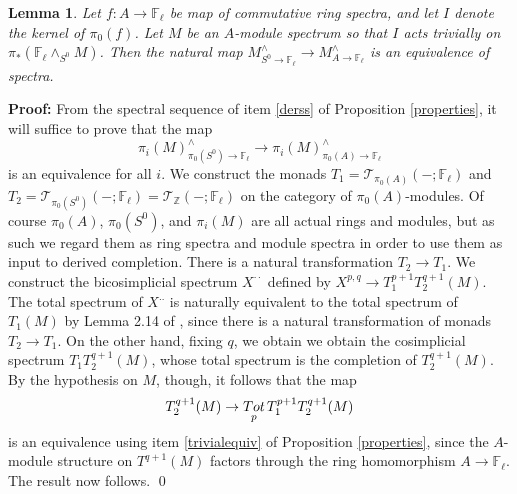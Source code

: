 \documentclass[11pt]{article}
\newcommand\mb{\mathbb}
\newcommand\mc{\mathcal}
\newtheorem{Lemma}{Lemma}[section]
\newenvironment{Proof}{\par\noindent\textbf{Proof:}}
{\qed}
\begin{document}
 \begin{Lemma}\label{sphereequiv} Let $f: A \rightarrow \mb{F}_{\ell} $ be map of commutative ring spectra, and let $I$ denote the kernel of $\pi _0(f)$.  Let $M$ be an $A$-module spectrum so that $I$ acts trivially on $\pi _*(\mb{F}_{\ell} \wedge _{S^0} M)$.  Then the natural map $M^{\wedge}_{S^0 \rightarrow \mb{F}_{\ell}}  \rightarrow M^{\wedge}_{A \rightarrow \mb{F}_{\ell}} $ is an equivalence of spectra.  
 \end{Lemma} 
 \begin{Proof}
     From the spectral sequence of item \ref{derss} of Proposition \ref{properties}, it will suffice to prove that the map 
 $$ \pi_i (M)^{\wedge}_{\pi _0(S^0) \rightarrow \mb{F}_{\ell} } \rightarrow \pi _i(M)^{\wedge} _{\pi _0(A) \rightarrow \mb{F}_{\ell} }$$ is an equivalence for all $i$. We construct the monads $T_1= \mc{T}_{\pi _0(A)}(-; \mb{F}_{\ell}) $ and $T_2= \mc{T}_{\pi _0(S^0) }(-; \mb{F}_{\ell}) = \mc{T}_{\mb{Z}}(-;\mb{F}_{\ell} )$ on the category of $\pi _0(A)$-modules. Of course $\pi _0(A)$, $\pi _0(S^0)$, and $\pi _i(M)$ are all actual rings and modules, but as such we regard them as  ring spectra and module spectra in order to  use them as input to derived completion. There is a natural transformation $T_2 \rightarrow T_1$.   We  construct the bicosimplicial spectrum $X^{\cdot \cdot}$ defined by $X^{p,q}  \rightarrow T_1^{p+1}T_2 ^{q+1}(M) $.  The total spectrum  of $X^{..}$ is naturally equivalent to the total spectrum of $T^{\cdot}_1(M)$ by Lemma 2.14 of \cite{completion}, since there is a natural transformation of monads $T_2 \rightarrow T_1.  $ On the other hand, fixing $q$, we obtain we obtain the cosimplicial spectrum $T_1^{.} T_2^{q+1}(M) $, whose total spectrum is the completion of $T_2^{q+1}(M)$.  By the hypothesis on $M$, though, it follows that the map 
 $$ T_2^{q+1}(M) \rightarrow \underset{p}{Tot}\hspace{.05cm}T_1 ^{p+1}T_2 ^{q+1}(M) 
 $$
 is an equivalence using item \ref{trivialequiv} of Proposition \ref{properties}, since the $A$-module structure on $T^{q+1}(M)$ factors through the ring homomorphism $A \rightarrow \mb{F}_{\ell}$.  The result now follows.  
 \end{Proof}
\end{document}

